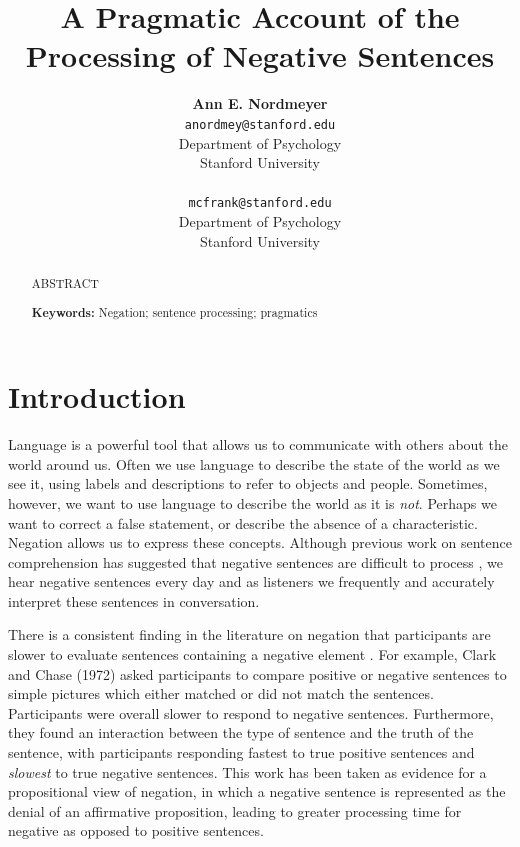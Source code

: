 \documentclass[10pt,letterpaper]{article}
\title{A Pragmatic Account of the Processing of Negative Sentences}
\author{{\large \bf Ann E. Nordmeyer} \\ \texttt{anordmey@stanford.edu}\\ Department of Psychology \\ Stanford University \\ 
\And {\large \bf Michael C. Frank} \\ \texttt{mcfrank@stanford.edu} \\ Department of Psychology \\ Stanford University \\ }
\begin{document}
\maketitle

\begin{abstract}

ABSTRACT


\textbf{Keywords:} 
Negation; sentence processing; pragmatics
\end{abstract}

\section{Introduction}

Language is a powerful tool that allows us to communicate with others about the world around us.  Often we use language to describe the state of the world as we see it, using labels and descriptions to refer to objects and people.  Sometimes, however, we want to use language to describe the world as it is \emph{not}.  Perhaps we want to correct a false statement, or describe the absence of a characteristic.  Negation allows us to express these concepts. Although previous work on sentence comprehension has suggested that negative sentences are difficult to process \cite{hclark1972, carpenter1975, just1971, just1976}, we hear negative sentences every day and as listeners we frequently and accurately interpret these sentences in conversation.  

There is a consistent finding in the literature on negation that participants are slower to evaluate sentences containing a negative element  \cite{hclark1972, carpenter1975, just1971, just1976}.  For example, Clark and Chase (1972) asked participants to compare positive or negative sentences to simple pictures which either matched or did not match the sentences.  Participants were overall slower to respond to negative sentences.  Furthermore, they found an interaction between the type of sentence and the truth of the sentence, with participants responding fastest to true positive sentences and \emph{slowest} to true negative sentences.  This work has been taken as evidence for a propositional view of negation, in which a negative sentence is represented as the denial of an affirmative proposition, leading to greater processing time for negative as opposed to positive sentences. 
\end{document}
